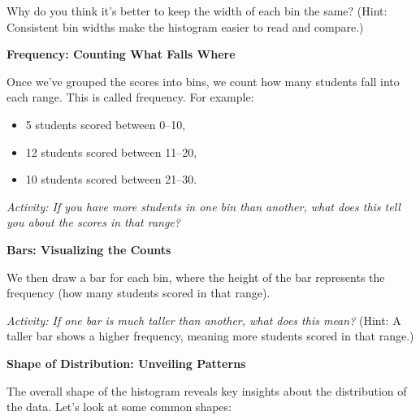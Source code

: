 Why do you think it’s better to keep the width of each bin the same? (Hint: Consistent bin widths make the histogram easier to read and compare.) \newline

\noindent\textbf{Frequency: Counting What Falls Where}

Once we’ve grouped the scores into bins, we count how many students fall into each range. This is called frequency. For example:
\begin{itemize}
    \item 5 students scored between 0–10,
    \item 12 students scored between 11–20,
    \item 10 students scored between 21–30.
\end{itemize}

\textit{Activity: If you have more students in one bin than another, what does this tell you about the scores in that range?} \newline

\noindent\textbf{Bars: Visualizing the Counts}

We then draw a bar for each bin, where the height of the bar represents the frequency (how many students scored in that range). \newline

\textit{Activity: If one bar is much taller than another, what does this mean?} (Hint: A taller bar shows a higher frequency, meaning more students scored in that range.)\newline

\noindent\textbf{Shape of Distribution: Unveiling Patterns}

The overall shape of the histogram reveals key insights about the distribution of the data. Let’s look at some common shapes:


